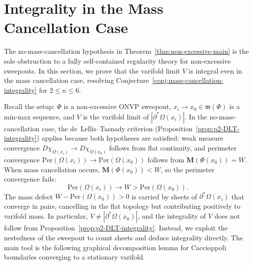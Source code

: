 
\section{Integrality in the Mass Cancellation Case}\label{sec:mass-cancellation-integrality}

The no-mass-cancellation hypothesis in Theorem~\ref{thm:non-excessive-main} is the sole obstruction to a fully self-contained regularity theory for non-excessive sweepouts. In this section, we prove that the varifold limit $V$ is integral even in the mass cancellation case, resolving Conjecture~\ref{conj:mass-cancellation-integrality} for $2 \leq n \leq 6$.

Recall the setup: $\Phi$ is a non-excessive ONVP sweepout, $x_i \to x_0 \in \mathfrak{m}(\Phi)$ is a min-max sequence, and $V$ is the varifold limit of $|\partial^*\Omega(x_i)|$. In the no-mass-cancellation case, the de~Lellis--Tasnady criterion (Proposition~\ref{prop:p2-DLT-integrality}) applies because both hypotheses are satisfied: weak measure convergence $D\chi_{\Omega(x_i)} \to D\chi_{\Omega(x_0)}$ follows from flat continuity, and perimeter convergence $\mathrm{Per}(\Omega(x_i)) \to \mathrm{Per}(\Omega(x_0))$ follows from $\mathbf{M}(\Phi(x_0)) = W$. When mass cancellation occurs, $\mathbf{M}(\Phi(x_0)) < W$, so the perimeter convergence fails:
\[
    \mathrm{Per}(\Omega(x_i)) \to W > \mathrm{Per}(\Omega(x_0)).
\]
The mass defect $W - \mathrm{Per}(\Omega(x_0)) > 0$ is carried by sheets of $\partial^*\Omega(x_i)$ that converge in pairs, cancelling in the flat topology but contributing positively to varifold mass. In particular, $V \neq |\partial^*\Omega(x_0)|$, and the integrality of $V$ does not follow from Proposition~\ref{prop:p2-DLT-integrality}. Instead, we exploit the nestedness of the sweepout to count sheets and deduce integrality directly. The main tool is the following graphical decomposition lemma for Caccioppoli boundaries converging to a stationary varifold.

